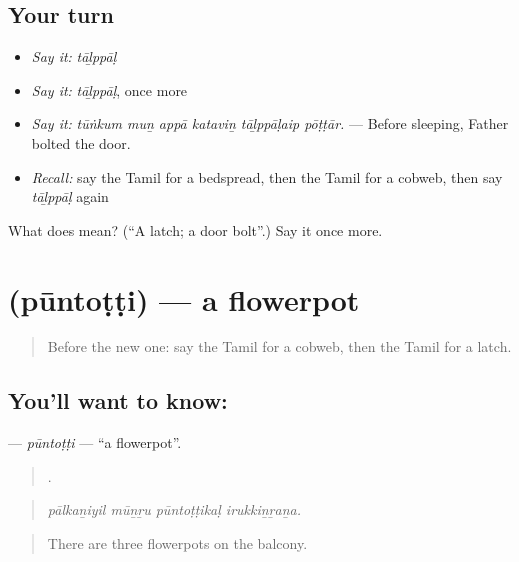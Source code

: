 \subsection*{Your turn}
\begin{itemize}
\raggedright
  \item \emph{Say it:} \emph{tāḻppāḷ}
  \item \emph{Say it:} \emph{tāḻppāḷ}, once more
  \item \emph{Say it:} \emph{tūṅkum muṉ appā kataviṉ tāḻppāḷaip pōṭṭār.} — Before sleeping, Father bolted the door.
  \item \emph{Recall:} say the Tamil for a bedspread, then the Tamil for a cobweb, then say \emph{tāḻppāḷ} again
\end{itemize}

\begin{tcolorbox}[breakable,colback=teal!4,colframe=teal!35!black,title={Before you move on}]
What does  mean? (\textquotedblleft{}A latch; a door bolt\textquotedblright{}.) Say it once more.
\end{tcolorbox}
\section[\texorpdfstring{\ta{பூந்தொட்டி} (pūntoṭṭi)}{பூந்தொட்டி (pūntoṭṭi)}]{ (pūntoṭṭi) — a flowerpot}

\label{lesson:TA-C521-puntotti}



\begin{quote}
Before the new one: say the Tamil for a cobweb, then the Tamil for a latch.
\end{quote}

\subsection*{You'll want to know: }
\textbf{} — \emph{pūntoṭṭi} — \textquotedblleft{}a flowerpot\textquotedblright{}.

\begin{quote}
   .
\end{quote}

\begin{quote}
\emph{pālkaṉiyil mūṉṟu pūntoṭṭikaḷ irukkiṉṟaṉa.}
\end{quote}

\begin{quote}
There are three flowerpots on the balcony.
\end{quote}

